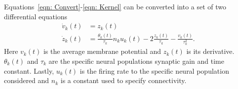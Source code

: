 Equations~\ref{eqn: Convert}-\ref{eqn: Kernel} can be converted into a set of two differential equations \begin{align}%
\label{eqn: FR2PSP1}
\dot{v}_{k}(t)&= z_{k}(t)\\
\label{eqn: FR2PSP2}
\dot{z}_{k}(t)&=\frac{\theta_{k}(t)}{\tau_{k}}n_{k}u_{k}(t)-2\frac{z_{k}(t)}{\tau_{k}}-\frac{v_{k}(t)}{\tau_{k}^{2}}.
\end{align} Here $v_{k}(t)$ is the average membrane potential and $z_{k}(t)$ is its derivative. $\theta_{k}(t)$ and $\tau_{k}$ are the specific neural populations synaptic gain and time constant. Lastly, $u_{k}(t)$ is the firing rate to the specific neural population considered and $n_{k}$ is a constant used to specify connectivity.

